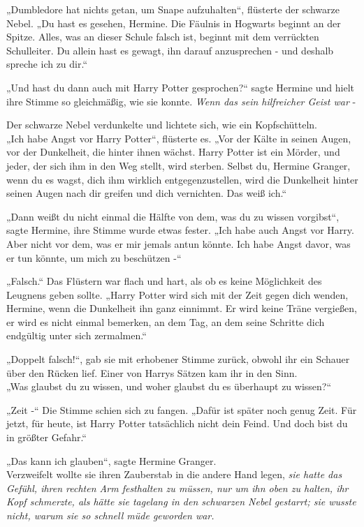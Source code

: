 {„Dumbledore hat nichts getan, um Snape aufzuhalten“, flüsterte der schwarze Nebel. „Du hast es gesehen, Hermine. Die Fäulnis in Hogwarts beginnt an der Spitze. Alles, was an dieser Schule falsch ist, beginnt mit dem verrückten Schulleiter. Du allein hast es gewagt, ihn darauf anzusprechen - und deshalb spreche ich zu dir.“

„Und hast du dann auch mit Harry Potter gesprochen?“ sagte Hermine und hielt ihre Stimme so gleichmäßig, wie sie konnte. \emph{Wenn das sein hilfreicher Geist war} -

Der schwarze Nebel verdunkelte und lichtete sich, wie ein Kopfschütteln.\\ „Ich habe Angst vor Harry Potter“, flüsterte es. „Vor der Kälte in seinen Augen, vor der Dunkelheit, die hinter ihnen wächst. Harry Potter ist ein Mörder, und jeder, der sich ihm in den Weg stellt, wird sterben. Selbst du, Hermine Granger, wenn du es wagst, dich ihm wirklich entgegenzustellen, wird die Dunkelheit hinter seinen Augen nach dir greifen und dich vernichten. Das weiß ich.“

„Dann weißt du nicht einmal die Hälfte von dem, was du zu wissen vorgibst“, sagte Hermine, ihre Stimme wurde etwas fester. „Ich habe auch Angst vor Harry. Aber nicht vor dem, was er mir jemals antun könnte. Ich habe Angst davor, was er tun könnte, um mich zu beschützen -“

„Falsch.“ Das Flüstern war flach und hart, als ob es keine Möglichkeit des Leugnens geben sollte. „Harry Potter wird sich mit der Zeit gegen dich wenden, Hermine, wenn die Dunkelheit ihn ganz einnimmt. Er wird keine Träne vergießen, er wird es nicht einmal bemerken, an dem Tag, an dem seine Schritte dich endgültig unter sich zermalmen.“

„Doppelt falsch!“, gab sie mit erhobener Stimme zurück, obwohl ihr ein Schauer über den Rücken lief. Einer von Harrys Sätzen kam ihr in den Sinn.\\ „Was glaubst du zu wissen, und woher glaubst du es überhaupt zu wissen?“

„Zeit -“ Die Stimme schien sich zu fangen. „Dafür ist später noch genug Zeit. Für jetzt, für heute, ist Harry Potter tatsächlich nicht dein Feind. Und doch bist du in größter Gefahr.“

„Das kann ich glauben“, sagte Hermine Granger.\\ Verzweifelt wollte sie ihren Zauberstab in die andere Hand legen, \emph{sie hatte das Gefühl, ihren rechten Arm festhalten zu müssen, nur um ihn oben zu halten, ihr Kopf schmerzte, als hätte sie tagelang in den schwarzen Nebel gestarrt; sie wusste nicht, warum sie so schnell müde geworden war.}

}
